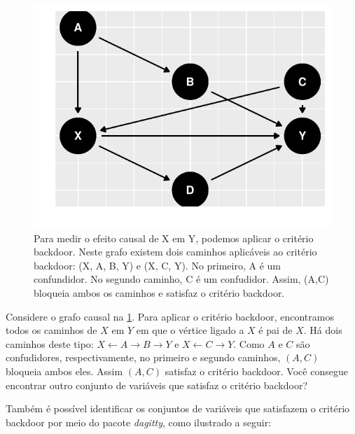 \begin{example}
\begin{knitrout}
\color{fgcolor}\begin{figure}[t]

{\centering \includegraphics[width=\maxwidth]{./figures/backdoor_ex_2-1} 

}

\caption[Para medir o efeito causal de X em Y, podemos aplicar o critério backdoor]{Para medir o efeito causal de X em Y, podemos aplicar o critério backdoor. Neste grafo existem dois caminhos aplicáveis ao critério backdoor: (X, A, B, Y) e (X, C, Y). No primeiro, A é um confundidor. No segundo caminho, C é um confudidor. Assim, (A,C) bloqueia ambos os caminhos e satisfaz o critério backdoor.}\label{fig:backdoor_ex_2}
\end{figure}

\end{knitrout}

 Considere o grafo causal na \cref{fig:backdoor_ex_2}.
 Para aplicar o critério backdoor,
 encontramos todos os caminhos de $X$ em $Y$ em que
 o vértice ligado a $X$ é pai de $X$. 
 Há dois caminhos deste tipo:
 $X \leftarrow A \rightarrow B \rightarrow Y$ e
 $X \leftarrow C \rightarrow Y$.
 Como $A$ e $C$ são confudidores, respectivamente,
 no primeiro e segundo caminhos, 
 $(A,C)$ bloqueia ambos eles.
 Assim $(A,C)$ satisfaz o critério backdoor.
 Você consegue encontrar outro conjunto de variáveis que
 satisfaz o critério backdoor?
 
 Também é possível identificar 
 os conjuntos de variáveis que satisfazem
 o critério backdoor por meio
 do pacote \textit{dagitty},
 como ilustrado a seguir:
 

\end{example}
